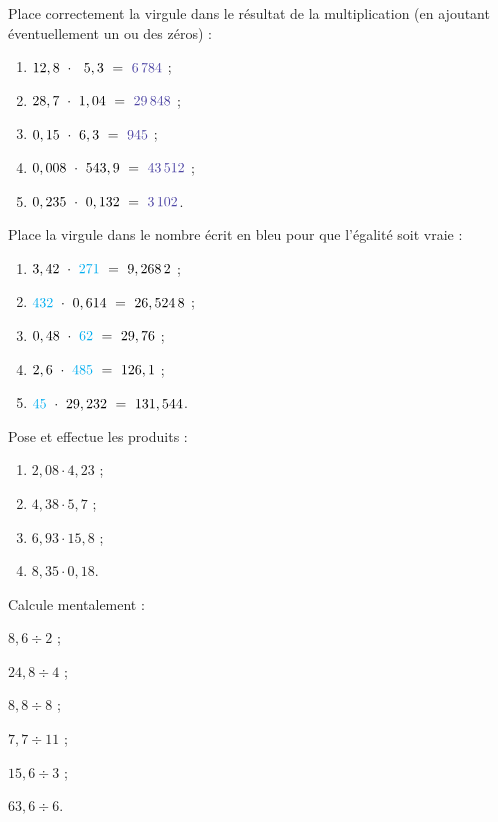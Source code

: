 \begin{exercice}
Place correctement la virgule dans le résultat de la multiplication (en ajoutant éventuellement un ou des zéros) :
\begin{enumerate} 
 \item $12,8 \cdot  5,3 = \textcolor{PartieGeometrie}{6\,784}$ ;
 \item $28,7 \cdot 1,04 = \textcolor{PartieGeometrie}{29\,848}$ ;
 \item $0,15 \cdot 6,3 = \textcolor{PartieGeometrie}{945}$ ;
 \item $0,008 \cdot 543,9 = \textcolor{PartieGeometrie}{43\,512}$ ;
 \item $0,235 \cdot 0,132 = \textcolor{PartieGeometrie}{3\,102}$.
 \end{enumerate}
\end{exercice}


\begin{exercice}
Place la virgule dans le nombre écrit en \textcolor{BleuOuv}{bleu} pour que l'égalité soit vraie :
\begin{enumerate} 
 \item $3,42 \cdot \textcolor{BleuOuv}{271} = 9,268\,2$ ;
 \item $\textcolor{BleuOuv}{432} \cdot 0,614 = 26,524\,8$ ;
 \item $0,48 \cdot \textcolor{BleuOuv}{62} = 29,76$ ;
 \item $2,6 \cdot \textcolor{BleuOuv}{485} = 126,1$ ;
 \item $\textcolor{BleuOuv}{45} \cdot 29,232 = 131,544$.
 \end{enumerate}
\end{exercice}

\begin{exercice}
Pose et effectue les produits :
\begin{enumerate} 
 \item $2,08 \cdot 4,23$ \dotfill ; 
 
 \item $4,38 \cdot 5,7$ \dotfill ; 
 
 \item $6,93 \cdot 15,8$ \dotfill ; 
 
 \item $8,35 \cdot 0,18 $\dotfill.  
 \end{enumerate}
\end{exercice}


\begin{exercice} 
Calcule mentalement :
\begin{colenumerate}{2}
 \item $ 8,6 \div 2$ ;
 \item $ 24,8 \div 4$ ;
 \item $ 8,8 \div 8$ ;
 \item $ 7,7 \div 11$ ;
 \item $ 15,6 \div 3$ ;
 \item $ 63,6 \div 6$.
 \end{colenumerate}
\end{exercice}



